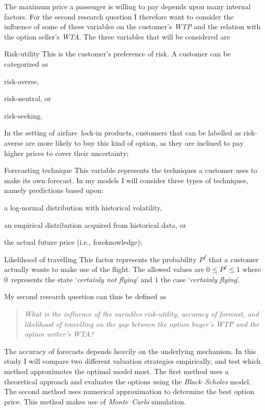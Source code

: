 The maximum price a passenger is willing to pay depends upon many internal factors. For the second research question I therefore want to consider the influence of some of these variables on the customer's \emph{WTP} and the relation with the option seller's \emph{WTA}. The three variables that will be considered are
\begin{compactdesc}
\item[Risk-utility] This is the customer's preference of risk. A customer can be categorized as \begin{inparaenum}
\item risk-averse,
\item risk-neutral, or
\item risk-seeking.
\end{inparaenum} In the setting of airfare~lock-in products, customers that can be labelled as risk-averse are more likely to buy this kind of option, as they are inclined to pay higher prices to cover their uncertainty;
\item[Forecasting technique] This variable represents the techniques a customer uses to make its own forecast. In my models I will consider three types of techniques, namely predictions based upon: \begin{inparaenum}
\item a log-normal distribution with historical volatility,
\item an empirical distribution acquired from historical data, or
\item the actual future price (i.e., foreknowledge);
\end{inparaenum}
\item[Likelihood of travelling] This factor represents the probability $P^f$ that a customer actually wants to make use of the flight. The allowed values are $0 \le P^f \le 1$ where $0$~represents the state `\emph{certainly not flying}' and $1$ the case  `\emph{certainly flying}'.
\vspace{1em}
\end{compactdesc}

\noindent
My second research question can thus be defined as
\begin{quote}\emph{What is the influence of the variables risk-utility, accuracy of forecast, and likelihood of travelling on the gap between the option buyer's WTP and the option writer's WTA?}\end{quote}

The accuracy of forecasts depends heavily on the underlying mechanism. In this study I will compare two different valuation strategies empirically, and test which meth\-od ap\-prox\-i\-mates the optimal model most. The first method uses a theoretical approach and evaluates the options using the \emph{Black--Scholes} model. The second method uses numerical approximation to determine the best option price. This method makes use of \emph{Monte~Carlo} simulation.

